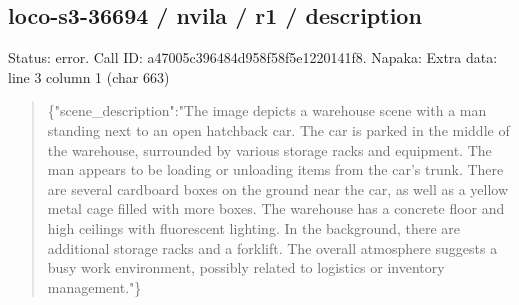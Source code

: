 \documentclass[10pt,a4paper]{article}
\begin{document}
\subsection*{loco-s3-36694 / nvila / r1 / description}
Status: error. Call ID: a47005c396484d958f58f5e1220141f8. Napaka: Extra data: line 3 column 1 (char 663)
\begin{quote}\footnotesize
\{"scene\_description":\allowbreak{}"The image depicts a warehouse scene with a man standing next to an open hatchback car. The car is parked in the middle of the warehouse,\allowbreak{} surrounded by various storage racks and equipment. The man appears to be loading or unloading items from the car's trunk. There are several cardboard boxes on the ground near the car,\allowbreak{} as well as a yellow metal cage filled with more boxes. The warehouse has a concrete floor and high ceilings with fluorescent lighting. In the background,\allowbreak{} there are additional storage racks and a forklift. The overall atmosphere suggests a busy work environment,\allowbreak{} possibly related to logistics or inventory management."\}\par
\par

\end{quote}
\end{document}
